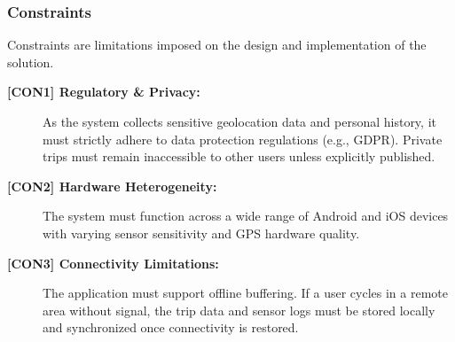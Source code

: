 \subsubsection{Constraints}
Constraints are limitations imposed on the design and implementation of the solution.

\begin{description}
    \item[\textbf{[CON1] Regulatory \& Privacy:}] As the system collects sensitive geolocation data and personal history, it must strictly adhere to data protection regulations (e.g., GDPR). Private trips must remain inaccessible to other users unless explicitly published.
    \item[\textbf{[CON2] Hardware Heterogeneity:}] The system must function across a wide range of Android and iOS devices with varying sensor sensitivity and GPS hardware quality.
    \item[\textbf{[CON3] Connectivity Limitations:}] The application must support offline buffering. If a user cycles in a remote area without signal, the trip data and sensor logs must be stored locally and synchronized once connectivity is restored.
\end{description}